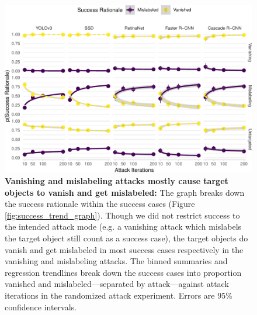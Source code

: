 

\begin{figure}[tb]

{\centering \includegraphics{rmd_imgs/success_trend_breakdown_graph-1} 

}

\caption{\textbf{Vanishing and mislabeling attacks mostly cause target objects to vanish and get mislabeled:}  The graph breaks down the success rationale within the success cases (Figure \ref{fig:success_trend_graph}). Though we did not restrict success to the intended attack mode (e.g. a vanishing attack which mislabels the target object still count as a success case), the target objects do vanish and get mislabeled in most success cases respectively in the vanishing and mislabeling attacks. The binned summaries and regression trendlines break down the success cases into proportion vanished and mislabeled---separated by attack---against attack iterations in the randomized attack experiment. Errors are 95\% confidence intervals. }\label{fig:success_trend_breakdown_graph}
\end{figure}

